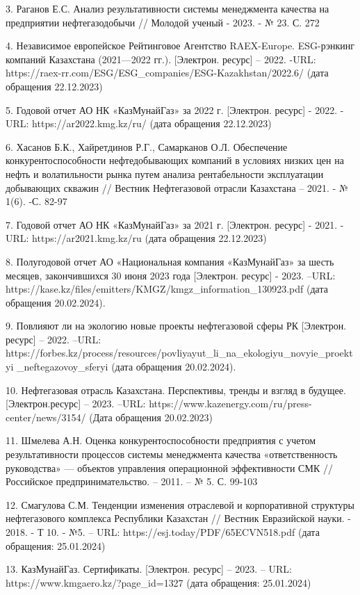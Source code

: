 3. Раганов Е.С. Анализ результативности системы менеджмента качества на
предприятии нефтегазодобычи // Молодой ученый - 2023. - № 23. С. 272

4. Независимое европейское Рейтинговое Агентство RAEX-Europe.
ESG-рэнкинг компаний Казахстана (2021---2022 гг.). {[}Электрон.
ресурс{]} -- 2022. -URL:
https://raex-rr.com/ESG/ESG\_companies/ESG-Kazakhstan/2022.6/ (дата
обращения 22.12.2023)

5. Годовой отчет АО НК «КазМунайГаз» за 2022 г. {[}Электрон. ресурс{]} -
2022. - URL: https://ar2022.kmg.kz/ru/ (дата обращения 22.12.2023)

6. Хасанов Б.К., Хайретдинов Р.Г., Самарканов О.Л. Обеспечение
конкурентоспособности нефтедобывающих компаний в условиях низких цен на
нефть и волатильности рынка путем анализа рентабельности эксплуатации
добывающих скважин // Вестник Нефтегазовой отрасли Казахстана -- 2021. -
№ 1(6). -С. 82-97

7. Годовой отчет АО НК «КазМунайГаз» за 2021 г. {[}Электрон. ресурс{]} -
2021. -URL: https://ar2021.kmg.kz/ru (дата обращения 22.12.2023)

8. Полугодовой отчет АО «Национальная компания «КазМунайГаз» за шесть
месяцев, закончившихся 30 июня 2023 года {[}Электрон. ресурс{]} - 2023.
--URL: https://kase.kz/files/emitters/KMGZ/kmgz\_information\_130923.pdf
(дата обращения 20.02.2024).

9. Повлияют ли на экологию новые проекты нефтегазовой сферы РК
{[}Электрон. ресурс{]} -- 2022. --URL:
https://forbes.kz/process/resources/povliyayut\_li\_na\_ekologiyu\_novyie\_proektyi
\_neftegazovoy\_sferyi (дата обращения 20.02.2024).

10. Нефтегазовая отрасль Казахстана. Перспективы, тренды и взгляд в
будущее. {[}Электрон.ресурс{]} -- 2023. --URL:
https://www.kazenergy.com/ru/press-center/news/3154/ (Дата обращения
20.02.2023)

11. Шмелева А.Н. Оценка конкурентоспособности предприятия с учетом
результативности процессов системы менеджмента качества «ответственность
руководства» --- объектов управления операционной эффективности СМК //
Российское предпринимательство. -- 2011. -- № 5. С. 99-103

12. Смагулова С.М. Тенденции изменения отраслевой и корпоративной
структуры нефтегазового комплекса Республики Казахстан // Вестник
Евразийской науки. - 2018. - Т 10. - №5. -- URL:
https://esj.today/PDF/65ECVN518.pdf (дата обращения: 25.01.2024)

13. КазМунайГаз. Сертификаты. {[}Электрон. ресурс{]} -- 2023. -- URL:
https://www.kmgaero.kz/?page\_id=1327 (дата обращения: 25.01.2024)

